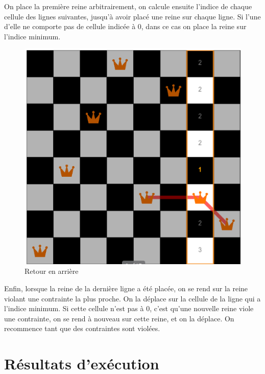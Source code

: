 \documentclass{article}
\begin{document}
On place la première reine arbitrairement, on calcule ensuite l'indice de chaque cellule des lignes suivantes, jusqu'à avoir placé une reine sur chaque ligne. Si l'une d'elle ne comporte pas de cellule indicée à 0, dans ce cas on place la reine sur l'indice minimum. 

\begin{figure}[!h]
	\caption{\label{local3} Retour en arrière}
	\begin{center}
	\includegraphics[scale=0.3]{./picture/local3.png}
	\end{center}
\end{figure}

Enfin, lorsque la reine de la dernière ligne a été placée, on se rend sur la reine violant une contrainte la plus proche. On la déplace sur la cellule de la ligne qui a l'indice minimum. Si cette cellule n'est pas à 0, c'est qu'une nouvelle reine viole une contrainte, on se rend à nouveau sur cette reine, et on la déplace. On recommence tant que des contraintes sont violées. 

\section{Résultats d'exécution}
\end{document}
